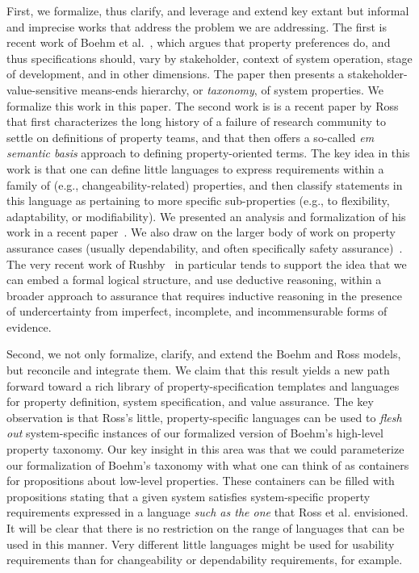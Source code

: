 \documentclass[conference]{IEEEtran}
\begin{document}
First, we formalize, thus clarify, and leverage and extend key extant but informal and imprecise works that address the problem we are addressing. The first is recent work of Boehm et al.~\cite{boehm}, which argues that property preferences do, and thus specifications should, vary by stakeholder, context of system operation, stage of development, and in other dimensions.  The paper then presents a stakeholder-value-sensitive means-ends hierarchy, or {\em taxonomy}, of system properties. We formalize this work in this paper. The second work is is a recent paper by Ross~\cite{}  that first characterizes the long history of a failure of research community to settle on definitions of property teams, and that then offers a so-called {\em em semantic basis} approach to defining property-oriented terms. The key idea in this work is that one can define little languages to express requirements within a family of (e.g., changeability-related) properties, and then classify statements in this language as pertaining to more specific sub-properties (e.g., to flexibility, adaptability, or modifiability). We presented an analysis and formalization of his work in a recent paper~\cite{sullivan-cser15}. We also draw on the larger body of work on property assurance cases (usually dependability, and often specifically safety assurance)~\cite{}. The very recent work of Rushby~\cite{} in particular tends to support the idea that we can embed a formal logical structure, and use deductive reasoning, within a broader approach to assurance that requires inductive reasoning in the presence of undercertainty from imperfect, incomplete, and incommensurable forms of evidence. 

Second, we not only formalize, clarify, and extend the Boehm and Ross models, but reconcile and integrate them. We claim that this result yields a new path forward toward a rich library of property-specification templates and languages for property definition, system specification, and value assurance. The key observation is that Ross's little, property-specific languages can be used to {\em flesh out} system-specific instances of our formalized version of Boehm's high-level property taxonomy. Our key insight in this area was that we could parameterize our formalization of Boehm's taxonomy with what one can think of as containers for propositions about low-level properties. These containers can be filled with propositions stating that a given system satisfies system-specific property requirements expressed in a language {\em such as the one} that Ross et al. envisioned. It will be clear that there is no restriction on the range of languages that can be used in this manner.  Very different little languages might be used for usability requirements than for changeability or dependability requirements, for example. 
\end{document}
